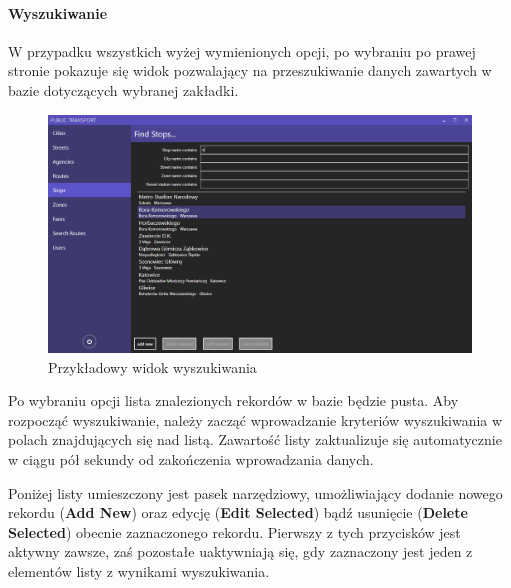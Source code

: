 \documentclass[10pt,a4paper]{article}
\begin{document}
\paragraph{Wyszukiwanie}
W przypadku wszystkich wyżej wymienionych opcji, po wybraniu po prawej stronie pokazuje się widok pozwalający na przeszukiwanie danych zawartych w bazie dotyczących wybranej zakładki.
\begin{figure}[H]
	\centering
	\includegraphics[width=15cm]{Resources/Images/13_filter_stops.png}
	\caption{Przykładowy widok wyszukiwania}
\end{figure}
Po wybraniu opcji lista znalezionych rekordów w bazie będzie pusta. Aby rozpocząć wyszukiwanie, należy zacząć wprowadzanie kryteriów wyszukiwania w polach znajdujących się nad listą. Zawartość listy zaktualizuje się automatycznie w ciągu pół sekundy od zakończenia wprowadzania danych.

Poniżej listy umieszczony jest pasek narzędziowy, umożliwiający dodanie nowego rekordu (\textbf{Add New}) oraz edycję (\textbf{Edit Selected}) bądź usunięcie (\textbf{Delete Selected}) obecnie zaznaczonego rekordu. Pierwszy z tych przycisków jest aktywny zawsze, zaś pozostałe uaktywniają się, gdy zaznaczony jest jeden z elementów listy z wynikami wyszukiwania.
\end{document}
